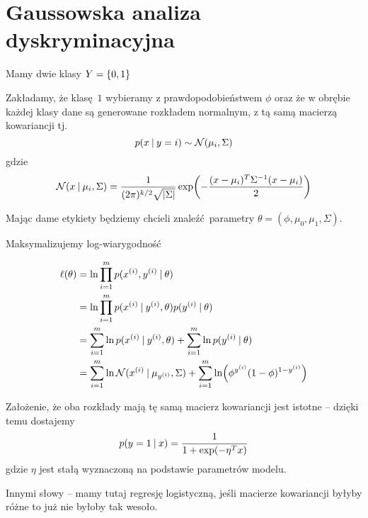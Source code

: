\section{Gaussowska analiza dyskryminacyjna}

Mamy dwie klasy \( Y = \set{0, 1} \)

Zakładamy, że klasę \( 1 \) wybieramy z prawdopodobieństwem \( \phi \) oraz że w obrębie każdej klasy dane są generowane rozkładem normalnym, z tą samą macierzą kowariancji tj.
\[
    p(x \:\vert\: y = i) \sim \operatorname{\mathcal{N}}(\mu_i, \Sigma)
\]
gdzie
\[
    \Normal(x \given \mu_i, \Sigma) = \frac{1}{(2\pi)^{k/2}\sqrt{\card{\Sigma}}} 
    \exp\pars{-\frac{(x - \mu_i)^T\Sigma^{-1}(x - \mu_i)}{2}}
\]

Mając dame etykiety będziemy chcieli znaleźć parametry \( \theta = (\phi, \mu_0, \mu_1, \Sigma) \).

Maksymalizujemy log-wiarygodność

\begin{align*}
    \ell(\theta)
        &= \ln \prod_{i=1}^m p(x^{(i)}, y^{(i)} \given \theta) \\
        &= \ln \prod_{i=1}^m p(x^{(i)} \given y^{(i)}, \theta) p(y^{(i)} \given \theta) \\
        &= \sum_{i=1}^m \ln p(x^{(i)} \given y^{(i)}, \theta) + \sum_{i=1}^m \ln p(y^{(i)} \given \theta) \\
        &= \sum_{i=1}^m \ln \Normal(x^{(i)} \given \mu_{y^{(i)}}, \Sigma) + \sum_{i=1}^m \ln \pars{\phi^{y^{(i)}}(1 -  \phi)^{1 - y^{(i)}}}
\end{align*}

Założenie, że oba rozkłady mają tę samą macierz kowariancji jest istotne -- dzięki temu dostajemy
\[
    p(y = 1 \:\vert\: x) = \frac{1}{1 + \exp(-\eta^T x)}
\]
gdzie \( \eta \) jest stałą wyznaczoną na podstawie parametrów modelu.

Innymi słowy -- mamy tutaj regresję logistyczną, jeśli macierze kowariancji byłyby różne to już nie byłoby tak wesoło.